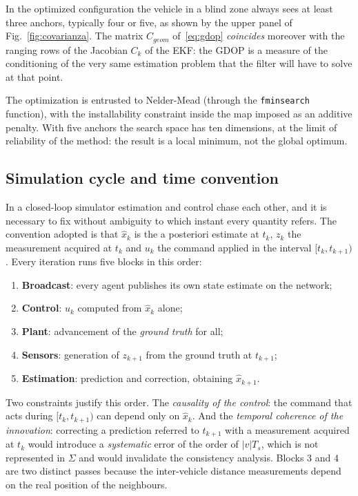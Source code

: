 \documentclass[conference,9pt]{IEEEtran}
\begin{document}
In the optimized configuration the vehicle in a blind zone always sees at least
three anchors, typically four or five, as shown by the upper panel of
Fig.~\ref{fig:covarianza}. The matrix $C_{geom} $ of~\eqref{eq:gdop}
\emph{coincides} moreover with the ranging rows of the Jacobian $C_k$ of the
EKF: the GDOP is a measure of the conditioning of the very same estimation
problem that the filter will have to solve at that point.

The optimization is entrusted to Nelder-Mead (through the \texttt{fminsearch}
function), with the installability constraint inside the map imposed as an
additive penalty. With five anchors the search space has ten dimensions, at the
limit of reliability of the method: the result is a local minimum, not the
global optimum.

\subsection{Simulation cycle and time convention}

In a closed-loop simulator estimation and control chase each other, and it is
necessary to fix without ambiguity to which instant every quantity refers. The
convention adopted is that $\hat x_k$ is the a posteriori estimate at $t_k$,
$z_k$ the measurement acquired at $t_k$ and $u_k$ the command applied in the
interval $[t_k, t_{k+1})$. Every iteration runs five blocks in this order:

\begin{enumerate}
\item \textbf{Broadcast}: every agent publishes its own state estimate on the
      network;
\item \textbf{Control}: $u_k$ computed from $\hat x_k$ alone;
\item \textbf{Plant}: advancement of the \emph{ground truth} for all;
\item \textbf{Sensors}: generation of $z_{k+1}$ from the ground truth at
      $t_{k+1}$;
\item \textbf{Estimation}: prediction and correction, obtaining $\hat x_{k+1}$.
\end{enumerate}

Two constraints justify this order. The \emph{causality of the control}: the
command that acts during $[t_k, t_{k+1})$ can depend only on $\hat x_k$. And
the \emph{temporal coherence of the innovation}: correcting a prediction
referred to $t_{k+1}$ with a measurement acquired at $t_k$ would introduce a
\emph{systematic} error of the order of $|v|T_s$, which is not represented in
$\Sigma$ and would invalidate the consistency analysis. Blocks 3 and 4 are two
distinct passes because the inter-vehicle distance measurements depend on the
real position of the neighbours.
\end{document}
